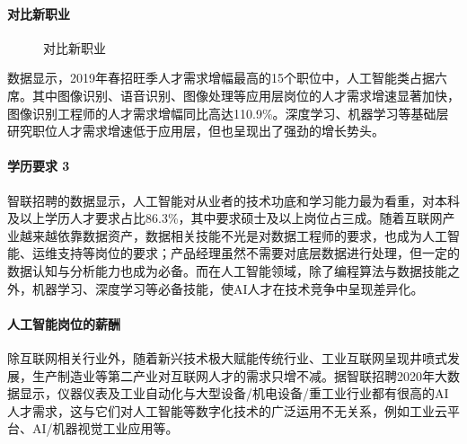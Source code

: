 \documentclass[letterpaper,11pt,english]{sphinxmanual}
\begin{document}
\paragraph{对比新职业}
\label{\detokenize{chapter_project/AI_talents:id8}}
\begin{figure}[H]
\centering
\capstart

\noindent{}
\caption{对比新职业\sphinxfootnotemark[670]}\label{\detokenize{chapter_project/AI_talents:id21}}\end{figure}
%
\begin{footnotetext}[670]\sphinxAtStartFootnote
{}
%
\end{footnotetext}\ignorespaces 
数据显示，2019年春招旺季人才需求增幅最高的15个职位中，人工智能类占据六席。其中图像识别、语音识别、图像处理等应用层岗位的人才需求增速显著加快，图像识别工程师的人才需求增幅同比高达110.9\%。深度学习、机器学习等基础层研究职位人才需求增速低于应用层，但也呈现出了强劲的增长势头。%
\begin{footnote}[671]\sphinxAtStartFootnote
{}
%
\end{footnote}


\paragraph{学历要求 3\sphinxfootnotemark[672]}
\label{\detokenize{chapter_project/AI_talents:id9}}%
\begin{footnotetext}[672]\sphinxAtStartFootnote
{}
%
\end{footnotetext}\ignorespaces 
智联招聘的数据显示，人工智能对从业者的技术功底和学习能力最为看重，对本科及以上学历人才要求占比86.3\%，其中要求硕士及以上岗位占三成。随着互联网产业越来越依靠数据资产，数据相关技能不光是对数据工程师的要求，也成为人工智能、运维支持等岗位的要求；产品经理虽然不需要对底层数据进行处理，但一定的数据认知与分析能力也成为必备。而在人工智能领域，除了编程算法与数据技能之外，机器学习、深度学习等必备技能，使AI人才在技术竞争中呈现差异化。


\paragraph{人工智能岗位的薪酬}
\label{\detokenize{chapter_project/AI_talents:id10}}
除互联网相关行业外，随着新兴技术极大赋能传统行业、工业互联网呈现井喷式发展，生产制造业等第二产业对互联网人才的需求只增不减。据智联招聘2020年大数据显示，仪器仪表及工业自动化与大型设备/机电设备/重工业行业都有很高的AI人才需求，这与它们对人工智能等数字化技术的广泛运用不无关系，例如工业云平台、AI/机器视觉工业应用等。
\end{document}
